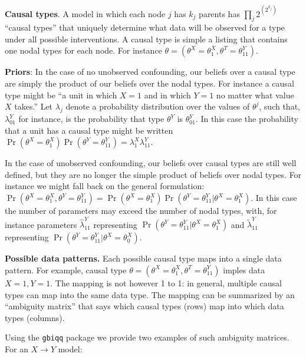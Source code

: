 \documentclass[12pt,]{book}
\begin{document}
\textbf{Causal types}. A model in which each node \(j\) has \(k_j\) parents has \(\prod_j2^{\left(2^{k_j}\right)}\) ``causal types'' that uniquely determine what data will be observed for a type under all possible interventions. A causal type is simple a listing that contains one nodal types for each node. For instance \(\theta = (\theta^X = \theta^X_1, \theta^T = \theta^Y_{11})\).

\textbf{Priors}: In the case of no unobserved confounding, our beliefs over a causal type are simply the product of our beliefs over the nodal types. For instance a causal type might be ``a unit in which \(X=1\) and in which \(Y=1\) no matter what value \(X\) takes.'' Let \(\lambda_j\) denote a probability distribution over the values of \(\theta^j\), such that, \(\lambda^Y_{01}\) for instance, is the probability that type \(\theta^Y\) is \(\theta^Y_{01}\). In this case the probability that a unit has a causal type might be written \(\Pr(\theta^X = \theta^X_1)\Pr(\theta^Y = \theta^Y_{11}) = \lambda^X_1\lambda^Y_{11}\).

In the case of unobserved confounding, our beliefs over causal types are still well defined, but they are no longer the simple product of beliefs over nodal types. For instance we might fall back on the general formulation: \(\Pr(\theta^X = \theta^X_1, \theta^Y = \theta^Y_{11}) = \Pr(\theta^X = \theta^X_1)\Pr(\theta^Y = \theta^Y_{11}|\theta^X = \theta^X_1)\). In this case the number of parameters may exceed the number of nodal types, with, for instance parameters \(\hat{\lambda}^Y_{11}\) representing \(\Pr(\theta^Y = \theta^Y_{11}|\theta^X = \theta^X_1)\) and \(\tilde{\lambda}^Y_{11}\) representing \(\Pr(\theta^Y = \theta^Y_{11}|\theta^X = \theta^X_0)\).

\textbf{Possible data patterns.} Each possible causal type maps into a single data pattern. For example, causal type \(\theta = (\theta^X = \theta^X_1, \theta^T = \theta^Y_{11})\) imples data \(X=1, Y=1\). The mapping is not however 1 to 1: in general, multiple causal types can map into the same data type. The mapping can be summarized by an ``ambiguity matrix'' that says which causal types (rows) map into which data types (columns).

Using the \texttt{gbiqq} package we provide two examples of such ambiguity matrices. For an \(X \rightarrow Y\) model:
\end{document}
